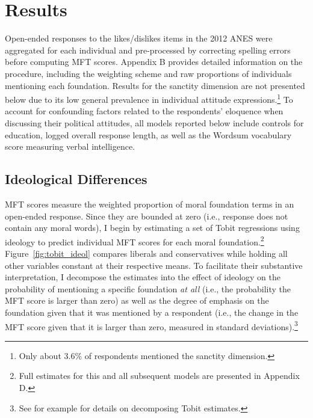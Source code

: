 \documentclass[12pt]{article}
\begin{document}
\section*{Results}

Open-ended responses to the likes/dislikes items in the 2012 ANES were aggregated for each individual and pre-processed by correcting spelling errors before computing MFT scores. Appendix B provides detailed information on the procedure, including the weighting scheme and raw proportions of individuals mentioning each foundation. Results for the sanctity dimension are not presented below due to its low general prevalence in individual attitude expressions.\footnote{Only about 3.6\% of respondents mentioned the sanctity dimension.} To account for confounding factors related to the respondents' eloquence when discussing their political attitudes, all models reported below include controls for education, logged overall response length, as well as the Wordsum vocabulary score measuring verbal intelligence.


\subsection*{Ideological Differences}

MFT scores measure the weighted proportion of moral foundation terms in an open-ended response. Since they are bounded at zero (i.e., response does not contain any moral words), I begin by estimating a set of Tobit regressions using ideology to predict individual MFT scores for each moral foundation.\footnote{Full estimates for this and all subsequent models are presented in Appendix D.} Figure~\ref{fig:tobit_ideol} compares liberals and conservatives while holding all other variables constant at their respective means. To facilitate their substantive interpretation, I decompose the estimates into the effect of ideology on the probability of mentioning a specific foundation \textit{at all} (i.e., the probability the MFT score is larger than zero) as well as the degree of emphasis on the foundation given that it was mentioned by a respondent (i.e., the change in the MFT score given that it is larger than zero, measured in standard deviations).\footnote{See for example \citet{mcdonald1980uses} for details on decomposing Tobit estimates.}
\end{document}
